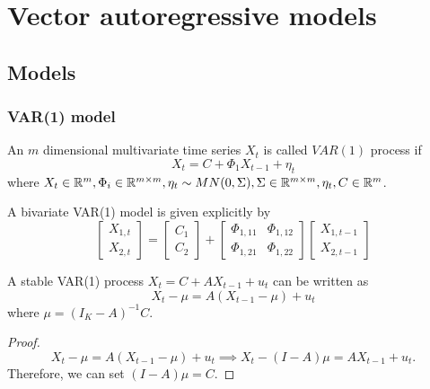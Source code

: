 \section{Vector autoregressive models}
\subsection{Models}



\subsubsection{VAR(1) model}
\begin{definition}[VAR(1)]
An $m$ dimensional multivariate time series $X_t$ is called $VAR(1)$ process if 
$$X_t = C + \Phi_1 X_{t-1} + \eta_t$$
where $X_t\in \mathbb{R}^m,\Phi_i\in \mathbb{R}^{m\times m}, \eta_t\sim MN(0,\Sigma),\Sigma \in \mathbb{R}^{m\times m}, \eta_t, C \in \mathbb{R}^m$.

\end{definition}

\begin{example}
A bivariate VAR(1) model is given explicitly by
$$\begin{bmatrix}
X_{1,t} \\
X_{2,t}
\end{bmatrix} = \begin{bmatrix}
C_1\\
C_2
\end{bmatrix} + \begin{bmatrix}
\Phi_{1,11} & \Phi_{1,12}\\
\Phi_{1,21} & \Phi_{1,22}
\end{bmatrix}\begin{bmatrix}
X_{1,t-1}\\
X_{2,t-1}  
\end{bmatrix}$$	
\end{example}

\begin{lemma}
	A stable VAR(1) process $X_t = C + A X_{t-1} + u_t$  can be written as
	$$X_t - \mu = A(X_{t-1} - \mu) + u_t$$
	where $\mu = (I_K - A)^{-1}C$.
\end{lemma}
\begin{proof}
	$$X_t - \mu = A(X_{t-1} - \mu) + u_t \implies X_t - (I - A)\mu = AX_{t-1} + u_t.$$
	Therefore, we can set $(I-A)\mu = C$. 
\end{proof}







